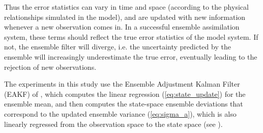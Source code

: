 Thus the error statistics can vary in time and space (according to the physical relationships simulated in the model), and are updated with new information whenever a new observation comes in.  
In a successful ensemble assimilation system, these terms should reflect the true error statistics of the model system.
If not, the ensemble filter will diverge, i.e. the uncertainty predicted by the ensemble will increasingly underestimate the true error, eventually leading to the rejection of new observations.

The experiments in this study use the Ensemble Adjustment Kalman Filter (EAKF) of \citet{anderson2001}, which computes the linear regression (\ref{eq:state_update}) for the ensemble mean, and then computes the state-space ensemble deviations that correspond to the updated ensemble variance (\ref{eq:sigma_a}), which is also linearly regressed from the observation space to the state space (see \citet{Anderson2003}). 
